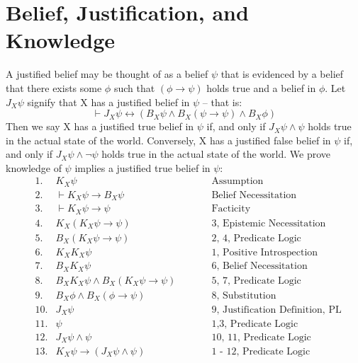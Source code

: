 \documentclass[12pt, titlepage, twoside, a4paper]{report}
\begin{document}
{\section{Belief, Justification, and Knowledge}
A justified belief may be thought of as a belief $\psi$ that is evidenced by a belief that there exists some $\phi$ such that $(\phi \to \psi)$ holds true and a belief in $\phi$. Let $J_X\psi$ signify that X has a justified belief in $\psi$ – that is:
$$\vdash J_X\psi \leftrightarrow (B_X \psi \wedge B_X(\psi \to \psi) \wedge B_X \phi)$$ 
Then we say X has a justified true belief in $\psi$ if, and only if $J_X\psi \wedge \psi$ holds true in the actual state of the world. Conversely, X has a justified false belief in $\psi$ if, and only if $J_X\psi \wedge \neg \psi$ holds true in the actual state of the world. 
We prove knowledge of $\psi$ implies a justified true belief in $\psi$:
\begin{align*}
&1.  	&K_X\psi		\qquad \qquad \qquad	\qquad	&\text{Assumption}\\
&2. 		 	&\vdash K_X\psi \to B_X\psi		\qquad	\qquad \qquad	\qquad		&\text{Belief Necessitation}\\
&3. 			&\vdash K_X\psi \to \psi 				&\text{Facticity}\\
&4. 			&K_X(K_X\psi \to \psi 	)				&\text{3, Epistemic Necessitation}\\
&5. 			&B_X(K_X\psi \to \psi )					&\text{2, 4, Predicate Logic}\\
&6. 			&K_XK_X \psi								&\text{1, Positive Introspection}\\
&7.			&B_XK_X\psi								&\text{6, Belief Necessitation}\\
&8. 			&B_XK_X\psi \wedge B_X(K_X\psi \to \psi )	&\text{5, 7, Predicate Logic}\\
&9. 			&B_X\phi \wedge B_X(\phi \to \psi)		&\text{8, Substitution}\\
&10. 		&J_X\psi									&\text{9, Justification Definition, PL}\\
&11. 		&\psi 									&\text{1,3, Predicate Logic}\\
&12.			&J_X\psi \wedge \psi						&\text{10, 11, Predicate Logic}\\
&13. 		&K_X\psi \to (J_X\psi \wedge \psi )		&\text{1 - 12, Predicate Logic}
\end{align*}

}
\end{document}
